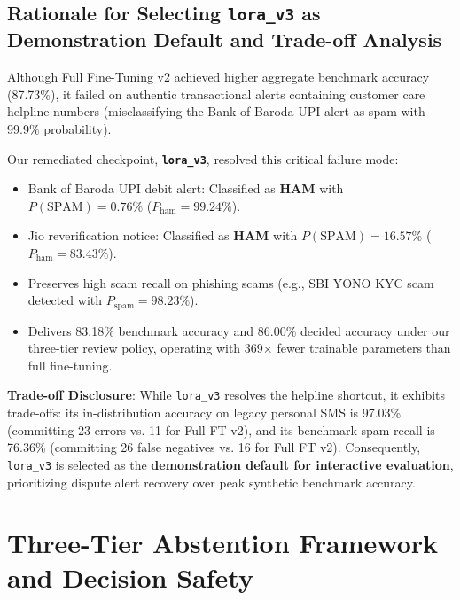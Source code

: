 \documentclass[conference]{IEEEtran}
\begin{document}
\subsection{Rationale for Selecting \texttt{lora\_v3} as Demonstration Default and Trade-off Analysis}
Although Full Fine-Tuning v2 achieved higher aggregate benchmark accuracy (87.73\%), it failed on authentic transactional alerts containing customer care helpline numbers (misclassifying the Bank of Baroda UPI alert as spam with 99.9\% probability).

Our remediated checkpoint, \textbf{\texttt{lora\_v3}}, resolved this critical failure mode:
\begin{itemize}
    \item Bank of Baroda UPI debit alert: Classified as \textbf{HAM} with $P(\text{SPAM}) = 0.76\%$ ($P_{\text{ham}} = 99.24\%$).
    \item Jio reverification notice: Classified as \textbf{HAM} with $P(\text{SPAM}) = 16.57\%$ ($P_{\text{ham}} = 83.43\%$).
    \item Preserves high scam recall on phishing scams (e.g., SBI YONO KYC scam detected with $P_{\text{spam}} = 98.23\%$).
    \item Delivers 83.18\% benchmark accuracy and 86.00\% decided accuracy under our three-tier review policy, operating with 369$\times$ fewer trainable parameters than full fine-tuning.
\end{itemize}

\textbf{Trade-off Disclosure}: While \texttt{lora\_v3} resolves the helpline shortcut, it exhibits trade-offs: its in-distribution accuracy on legacy personal SMS is 97.03\% (committing 23 errors vs. 11 for Full FT v2), and its benchmark spam recall is 76.36\% (committing 26 false negatives vs. 16 for Full FT v2). Consequently, \texttt{lora\_v3} is selected as the \textbf{demonstration default for interactive evaluation}, prioritizing dispute alert recovery over peak synthetic benchmark accuracy.

\section{Three-Tier Abstention Framework and Decision Safety}
\label{sec:abstention}
\end{document}
